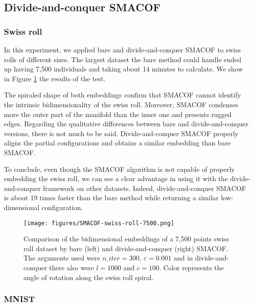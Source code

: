 \subsection{Divide-and-conquer SMACOF}
\label{sec:dc-SMACOF}

\subsubsection{Swiss roll}
\label{sec:dc-SMACOF-swiss-roll}

In this experiment, we applied bare and divide-and-conquer SMACOF to swiss rolls of different sizes. The largest dataset the bare method could handle ended up having 7,500 individuals and taking about 14 minutes to calculate. We show in Figure \ref{fig:SMACOF-swiss-roll-7500} the results of the test.

The spiraled shape of both embeddings confirm that SMACOF cannot identify the intrinsic bidimensionality of the swiss roll. Moreover, SMACOF condenses more the outer part of the manifold than the inner one and presents rugged edges. Regarding the qualitative differences between bare and divide-and-conquer versions, there is not much to be said. Divide-and-conquer SMACOF properly aligns the partial configurations and obtains a similar embedding than bare SMACOF.

To conclude, even though the SMACOF algorithm is not capable of properly embedding the swiss roll, we can see a clear advantage in using it with the divide-and-conquer framework on other datasets. Indeed, divide-and-conquer SMACOF is about 19 times faster than the bare method while returning a similar low-dimensional configuration.

\begin{figure}
    \centering
    \texttt{[image: figures/SMACOF-swiss-roll-7500.png]}
    \caption{Comparison of the bidimensional embeddings of a 7,500 points swiss roll dataset by bare (left) and divide-and-conquer (right) SMACOF. The arguments used were $n\_iter = 300,\, \varepsilon = 0.001$ and in divide-and-conquer there also were $l=1000$ and $c=100$. Color represents the angle of rotation along the swiss roll spiral.}
    \label{fig:SMACOF-swiss-roll-7500}
\end{figure}


\subsubsection{MNIST}
\label{sec:dc-SMACOF-MNIST}

